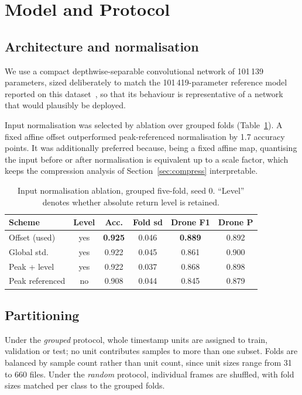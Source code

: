 \documentclass[conference]{IEEEtran}
\begin{document}
\section{Model and Protocol}
\label{sec:baseline}

\subsection{Architecture and normalisation}

We use a compact depthwise-separable convolutional network of 101\,139
parameters, sized deliberately to match the 101\,419-parameter reference
model reported on this dataset~\cite{zhang2025}, so that its behaviour is
representative of a network that would plausibly be deployed.

Input normalisation was selected by ablation over grouped folds
(Table~\ref{tab:norm}). A fixed affine offset outperformed peak-referenced
normalisation by 1.7 accuracy points. It was additionally preferred because,
being a fixed affine map, quantising the input before or after
normalisation is equivalent up to a scale factor, which keeps the
compression analysis of Section~\ref{sec:compress} interpretable.

\begin{table}[t]
\caption{Input normalisation ablation, grouped five-fold, seed 0.
``Level'' denotes whether absolute return level is retained.}
\label{tab:norm}
\centering
\small
\setlength{\tabcolsep}{4pt}
\begin{tabular}{@{}lccccc@{}}
\toprule
Scheme & Level & Acc. & Fold sd & Drone F1 & Drone P \\
\midrule
Offset (used)   & yes & \textbf{0.925} & 0.046 & \textbf{0.889} & 0.892 \\
Global std.     & yes & 0.922 & 0.045 & 0.861 & 0.900 \\
Peak + level    & yes & 0.922 & 0.037 & 0.868 & 0.898 \\
Peak referenced & no  & 0.908 & 0.044 & 0.845 & 0.879 \\
\bottomrule
\end{tabular}
\end{table}

\subsection{Partitioning}

Under the \emph{grouped} protocol, whole timestamp units are assigned to
train, validation or test; no unit contributes samples to more than one
subset. Folds are balanced by sample count rather than unit count, since
unit sizes range from 31 to 660 files. Under the \emph{random} protocol,
individual frames are shuffled, with fold sizes matched per class to the
grouped folds.
\end{document}
